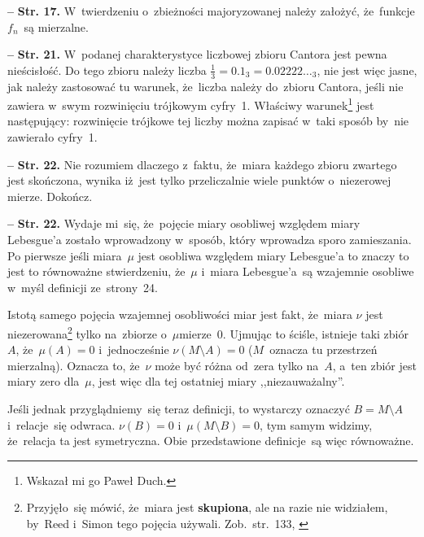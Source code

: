 \documentclass[a4paper,11pt]{article}
\newcommand{\spaceFour}{0.5em}
\newcommand{\ld}{\ldots}
\newcommand{\fr}{\frac}
\newcommand{\setm}{\setminus}
\newcommand{\tb}{\textbf}
\newcommand{\noi}{\noindent}
\newcommand{\start}{\noi \tb{--} {}}
\newcommand{\Str}[1]{\tb{Str. #1.}}
\newcommand{\Dok}{{\color{red} Dokończ.}}
\begin{document}
\vspace{\spaceFour}


\start \Str{17} W~twierdzeniu o~zbieżności majoryzowanej należy
założyć, że~funkcje $f_{ n }$~są mierzalne. %

\vspace{\spaceFour}


\start \Str{21} W~podanej charakterystyce liczbowej zbioru Cantora
jest pewna nieścisłość. Do tego zbioru należy liczba
$\fr{ 1 }{ 3 } = 0.1_{ 3 } = 0.02222\ld_{ 3 }$, nie jest więc jasne,
jak należy zastosować tu warunek, że~liczba należy do~zbioru Cantora,
jeśli nie zawiera w~swym rozwinięciu trójkowym cyfry~1. Właściwy
warunek\footnote{Wskazał mi go Paweł Duch.} jest następujący:
rozwinięcie trójkowe tej liczby można zapisać w~taki sposób by~nie
zawierało cyfry~1. %

\vspace{\spaceFour}


\start \Str{22} Nie rozumiem dlaczego z~faktu, że~miara każdego zbioru
zwartego jest skończona, wynika iż~jest tylko przeliczalnie wiele
punktów o~niezerowej mierze. \Dok

\vspace{\spaceFour}


\start \Str{22} Wydaje mi~się, że~pojęcie miary osobliwej względem
miary Lebesgue'a zostało wprowadzony w~sposób, który wprowadza sporo
zamieszania. Po pierwsze jeśli miara~$\mu$ jest osobliwa względem
miary Lebesgue'a to znaczy to jest to równoważne stwierdzeniu,
że~$\mu$ i~miara Lebesgue'a~są wzajemnie osobliwe w~myśl definicji
ze~strony~24.

Istotą samego pojęcia wzajemnej osobliwości miar jest fakt, że~miara
$\nu$ jest niezerowana\footnote{Przyjęło~się mówić, że~miara jest
  \tb{skupiona}, ale na razie nie widziałem, by~Reed i~Simon tego
  pojęcia używali. Zob.~str.~133, \cite{Rudin98}} tylko na~zbiorze
o~$\mu$\dywiz mierze~0. Ujmując to ściśle, istnieje taki zbiór~$A$,
że~$\mu( A ) = 0$ i~jednocześnie $\nu( M \setm A ) = 0$ ($M$~oznacza
tu przestrzeń mierzalną). Oznacza to, że~$\nu$ może być różna od~zera
tylko na~$A$, a~ten zbiór jest miary zero dla~$\mu$, jest więc dla tej
ostatniej miary ,,niezauważalny''.

Jeśli jednak przyglądniemy~się teraz definicji, to wystarczy oznaczyć
$B = M \setm A$ i~relacje~się odwraca. $\nu( B ) = 0$
i~$\mu( M \setm B ) = 0$, tym samym widzimy, że~relacja ta jest
symetryczna. Obie przedstawione definicje~są więc równoważne.
\end{document}
